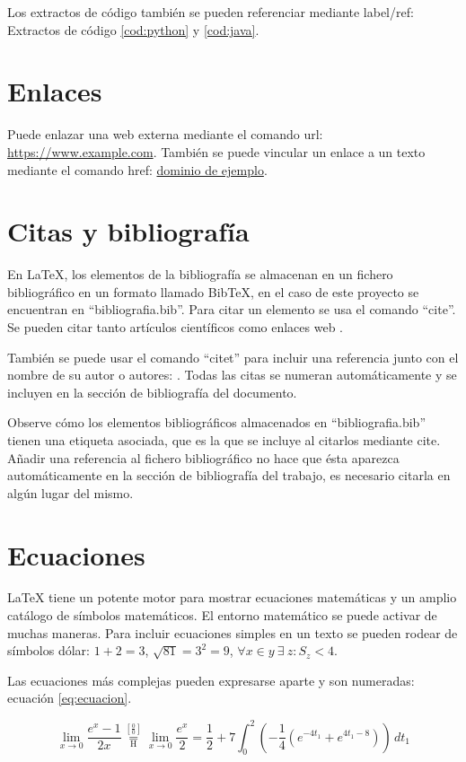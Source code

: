 Los extractos de código también se pueden referenciar mediante label/ref: Extractos de código \ref{cod:python} y \ref{cod:java}.

\section{Enlaces}
Puede enlazar una web externa mediante el comando url: \url{https://www.example.com}. También se puede vincular un enlace a un texto mediante el comando href: \href{https://www.example.com}{dominio de ejemplo}.

\section{Citas y bibliografía}
En LaTeX, los elementos de la bibliografía se almacenan en un fichero bibliográfico en un formato llamado BibTeX, en el caso de este proyecto se encuentran en ``bibliografia.bib''. Para citar un elemento se usa el comando ``cite''. Se pueden citar tanto artículos científicos \cite{borrego2019} como enlaces web \cite{webETSII}. 

También se puede usar el comando ``citet'' para incluir una referencia junto con el nombre de su autor o autores: \citet{borrego2021}. Todas las citas se numeran automáticamente y se incluyen en la sección de bibliografía del documento.

Observe cómo los elementos bibliográficos almacenados en ``bibliografia.bib'' tienen una etiqueta asociada, que es la que se incluye al citarlos mediante cite. Añadir una referencia al fichero bibliográfico no hace que ésta aparezca automáticamente en la sección de bibliografía del trabajo, es necesario citarla en algún lugar del mismo.

\section{Ecuaciones}
LaTeX tiene un potente motor para mostrar ecuaciones matemáticas y un amplio catálogo de símbolos matemáticos. El entorno matemático se puede activar de muchas maneras. Para incluir ecuaciones simples en un texto se pueden rodear de símbolos dólar: $1 + 2 = 3$, $\sqrt{81} = 3^2 = 9$, $\forall x \in y~\exists~z : S_z < 4$.

Las ecuaciones más complejas pueden expresarse aparte y son numeradas: ecuación \ref{eq:ecuacion}.

\begin{equation}\label{eq:ecuacion}
\lim_{x\to 0}{\frac{e^x-1}{2x}}
 \overset{\left[\frac{0}{0}\right]}{\underset{\mathrm{H}}{=}}
 \lim_{x\to 0}{\frac{e^x}{2}}={\frac{1}{2}}
 +7 \int_0^2
  \left(
    -\frac{1}{4}\left(e^{-4t_1}+e^{4t_1-8}\right)
  \right)\,dt_1
\end{equation}

